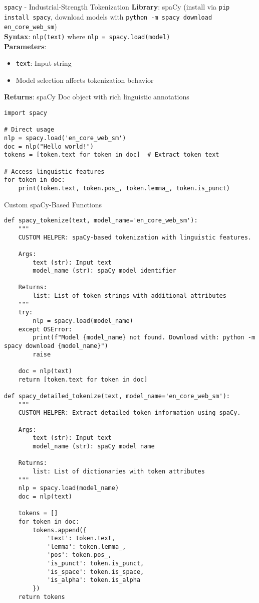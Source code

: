 \documentclass[11pt,a4paper]{article}
\begin{document}
\begin{nativebox}{\texttt{spacy} - Industrial-Strength Tokenization}
\textbf{Library}: spaCy (install via \texttt{pip install spacy}, download models with \texttt{python -m spacy download en\_core\_web\_sm}) \\
\textbf{Syntax}: \texttt{nlp(text)} where \texttt{nlp = spacy.load(model)} \\
\textbf{Parameters}:
\begin{itemize}
\item \texttt{text}: Input string
\item Model selection affects tokenization behavior
\end{itemize}

\textbf{Returns}: spaCy Doc object with rich linguistic annotations

\begin{lstlisting}[caption=Direct spaCy usage]
import spacy

# Direct usage
nlp = spacy.load('en_core_web_sm')
doc = nlp("Hello world!")
tokens = [token.text for token in doc]  # Extract token text

# Access linguistic features
for token in doc:
    print(token.text, token.pos_, token.lemma_, token.is_punct)
\end{lstlisting}
\end{nativebox}

\begin{custombox}{Custom spaCy-Based Functions}

\begin{lstlisting}[caption=Custom spaCy wrapper functions]
def spacy_tokenize(text, model_name='en_core_web_sm'):
    """
    CUSTOM HELPER: spaCy-based tokenization with linguistic features.
    
    Args:
        text (str): Input text
        model_name (str): spaCy model identifier
        
    Returns:
        list: List of token strings with additional attributes
    """
    try:
        nlp = spacy.load(model_name)
    except OSError:
        print(f"Model {model_name} not found. Download with: python -m spacy download {model_name}")
        raise
    
    doc = nlp(text)
    return [token.text for token in doc]

def spacy_detailed_tokenize(text, model_name='en_core_web_sm'):
    """
    CUSTOM HELPER: Extract detailed token information using spaCy.
    
    Args:
        text (str): Input text
        model_name (str): spaCy model name
        
    Returns:
        list: List of dictionaries with token attributes
    """
    nlp = spacy.load(model_name)
    doc = nlp(text)
    
    tokens = []
    for token in doc:
        tokens.append({
            'text': token.text,
            'lemma': token.lemma_,
            'pos': token.pos_,
            'is_punct': token.is_punct,
            'is_space': token.is_space,
            'is_alpha': token.is_alpha
        })
    return tokens
\end{lstlisting}
\end{custombox}
\end{document}
